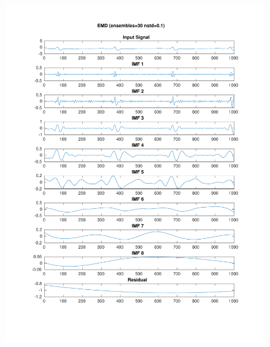 \documentclass[11pt,a4paper]{article}
\begin{document}
\begin{figure}[H]
\centering
\begin{minipage}{0.48\textwidth}
	\centering
	\includegraphics[width=\textwidth]{fig/118l1_emd_ensemble.pdf}
	

\end{minipage}
\end{figure}
\end{document}
